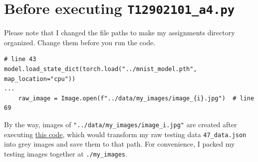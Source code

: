 \documentclass[12pt]{article}
\begin{document}
\section{Before executing \texttt{T12902101\_a4.py}}
Please note that I changed the file paths to make my assignments directory organized. Change them before you run the code. 

\begin{lstlisting}
# line 43
model.load_state_dict(torch.load("../mnist_model.pth", map_location="cpu"))
...
    raw_image = Image.open(f"../data/my_images/image_{i}.jpg")  # line 69
\end{lstlisting}

By the way, images of \texttt{"../data/my\_images/image\_i.jpg"} are created after executing \href{https://github.com/LazySheeeeep/Trustworthy_AI-Assignments/blob/main/data/transform_my_images.py}{this code}, which would transform my raw testing data \texttt{47\_data.json} into grey images and save them to that path. For convenience, I packed my testing images together at \texttt{./my\_images}.
% 
% 
\end{document}
